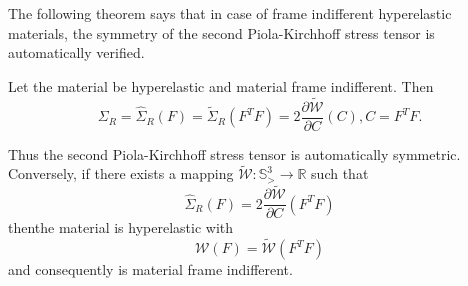The following theorem says that in case of frame indifferent
hyperelastic materials, the symmetry of the second Piola-Kirchhoff
stress tensor is automatically verified.

\begin{theorem}\label{chap1-thm1.4.3} %
  Let the material be hyperelastic and material frame indifferent. Then
  \begin{equation*}
    \Sigma_{R} = \hat{\Sigma}_{R} (F) = \tilde{\Sigma}_{R} (F^{T}F) = 2
    \frac{\partial \tilde{\mathcal{W}}}{\partial C} (C) , C =
    F^{T}F. \tag{1.4-23} \label{eq1.4-23}
  \end{equation*}

Thus the second Piola-Kirchhoff stress tensor is automatically
symmetric. Conversely, if there exists a mapping $\tilde{\mathcal{W}}:
\mathbb{S}^{3}_{>} \to \mathbb{R}$ such that  
\begin{equation*}
  \hat{\Sigma}_{R} (F) = 2 \frac {\partial \tilde{\mathcal{W}}}{\partial
    C} (F^{T}F) \tag{1.4-24} \label{eq1.4-24}
\end{equation*}
then\pageoriginale the material is hyperelastic with
\begin{equation*}
  \mathcal{W} (F) = \tilde{\mathcal{W}}(F ^{T}F) \tag{1.4-25}\label{eq1.4-25}
\end{equation*}
and consequently is material frame indifferent. 
\end{theorem}

